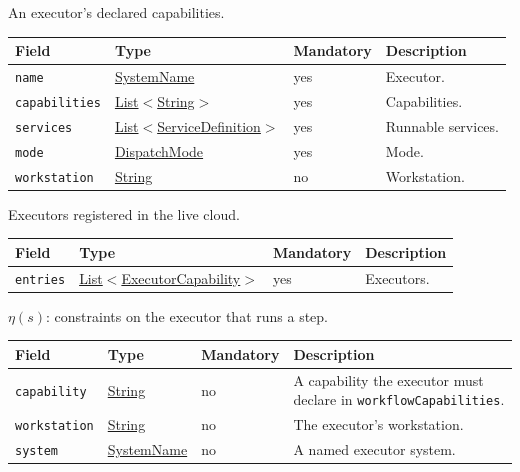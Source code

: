 \documentclass[a4paper]{arrowhead}
\newcommand{\mref}[1]{{\textcolor{ArrowheadPurple}{\hyperref[sec:model:#1]{#1}}}}
\newcommand{\pref}[1]{{\textcolor{ArrowheadGrey}{\hyperref[sec:model:primitives:#1]{#1}}}}
\begin{document}
An executor's declared capabilities.

{\small
\begin{longtable}{|p{3.7cm}|p{4.2cm}|p{1.6cm}|p{6.3cm}|}

\hline
\rowcolor{gray!33} Field & Type & Mandatory & Description \\ \hline
\endhead
\texttt{name} & \pref{SystemName} & yes & Executor. \\ \hline
\texttt{capabilities} & \pref{List}$<$\pref{String}$>$ & yes & Capabilities. \\ \hline
\texttt{services} & \pref{List}$<$\pref{ServiceDefinition}$>$ & yes & Runnable services. \\ \hline
\texttt{mode} & \mref{DispatchMode} & yes & Mode. \\ \hline
\texttt{workstation} & \pref{String} & no & Workstation. \\ \hline
\end{longtable}
}

Executors registered in the live cloud.

{\small
\begin{longtable}{|p{3.7cm}|p{4.2cm}|p{1.6cm}|p{6.3cm}|}

\hline
\rowcolor{gray!33} Field & Type & Mandatory & Description \\ \hline
\endhead
\texttt{entries} & \pref{List}$<$\mref{ExecutorCapability}$>$ & yes & Executors. \\ \hline
\end{longtable}
}

$\eta(s)$: constraints on the executor that runs a step.

{\small
\begin{longtable}{|p{3.7cm}|p{4.2cm}|p{1.6cm}|p{6.3cm}|}

\hline
\rowcolor{gray!33} Field & Type & Mandatory & Description \\ \hline
\endhead
\texttt{capability} & \pref{String} & no & A capability the executor must declare in \texttt{workflowCapabilities}. \\ \hline
\texttt{workstation} & \pref{String} & no & The executor's workstation. \\ \hline
\texttt{system} & \pref{SystemName} & no & A named executor system. \\ \hline
\end{longtable}
}
\end{document}
